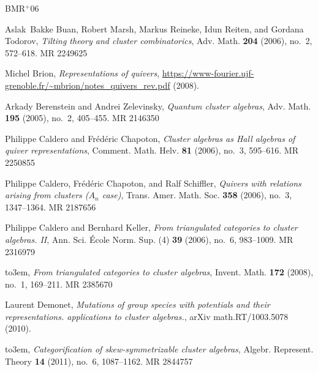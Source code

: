 \documentclass[12pt]{amsart}
\begin{document}
\newcommand{\etalchar}[1]{$^{#1}$}
\providecommand{\bysame}{\leavevmode\hbox to3em{\hrulefill}\thinspace}
\providecommand{\MR}{\relax\ifhmode\unskip\space\fi MR }
\providecommand{\MRhref}[2]{%
  \href{http://www.ams.org/mathscinet-getitem?mr=#1}{#2}
}
\providecommand{\href}[2]{#2}
\begin{thebibliography}{BMR{\etalchar{+}}06}

\bibitem[BMR{\etalchar{+}}06]{buan-marsh-reineke-reiten-todorov}
Aslak~Bakke Buan, Robert Marsh, Markus Reineke, Idun Reiten, and Gordana
  Todorov, \emph{Tilting theory and cluster combinatorics}, Adv. Math.
  \textbf{204} (2006), no.~2, 572--618. \MR{2249625}

Michel Brion, \emph{Representations of quivers},
\url{https://www-fourier.ujf-grenoble.fr/~mbrion/notes_quivers_rev.pdf} (2008).

Arkady Berenstein and Andrei Zelevinsky, \emph{Quantum cluster algebras}, Adv.
  Math. \textbf{195} (2005), no.~2, 405--455. \MR{2146350}

Philippe Caldero and Fr\'ed\'eric Chapoton, \emph{Cluster algebras as {H}all
  algebras of quiver representations}, Comment. Math. Helv. \textbf{81} (2006),
  no.~3, 595--616. \MR{2250855}

Philippe Caldero, Fr\'ed\'eric Chapoton, and Ralf Schiffler, \emph{Quivers with
  relations arising from clusters ({$A_n$} case)}, Trans. Amer. Math. Soc.
  \textbf{358} (2006), no.~3, 1347--1364. \MR{2187656}

Philippe Caldero and Bernhard Keller, \emph{From triangulated categories to
  cluster algebras. {II}}, Ann. Sci. \'Ecole Norm. Sup. (4) \textbf{39} (2006),
  no.~6, 983--1009. \MR{2316979}

\bysame, \emph{From triangulated categories to cluster algebras}, Invent. Math.
  \textbf{172} (2008), no.~1, 169--211. \MR{2385670}

Laurent Demonet, \emph{Mutations of group species with potentials and their
  representations. applications to cluster algebras.}, arXiv math.RT/1003.5078
  (2010).

\bysame, \emph{Categorification of skew-symmetrizable cluster algebras},
  Algebr. Represent. Theory \textbf{14} (2011), no.~6, 1087--1162. \MR{2844757}


\end{thebibliography}
\end{document}
